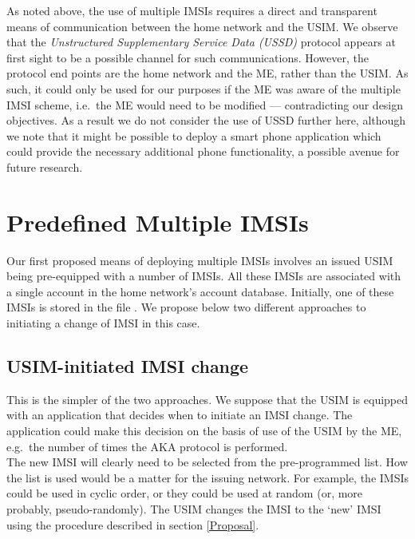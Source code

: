 \documentclass{acm_proc_article-sp}
\begin{document}
\begin{itemize}
\begin{enumerate}
\end{enumerate}

\end{itemize}

As noted above, the use of multiple IMSIs requires a direct and transparent means of communication between the home network and the USIM. We observe that the \emph{Unstructured Supplementary Service Data (USSD)} protocol appears at first sight to be a possible channel for such communications. However, the protocol end points are the home network and the ME, rather than the USIM. As such, it could only be used for our purposes if the ME was aware of the multiple IMSI scheme, i.e.\ the ME would need to be modified --- contradicting our design objectives. As a result we do not consider the use of USSD further here, although we note that it might be possible to deploy a smart phone application which could provide the necessary additional phone functionality, a possible avenue for future research.


\section{Predefined Multiple IMSIs} \label{Proposal-PM-IMSI}

Our first proposed means of deploying multiple IMSIs involves an issued USIM being pre-equipped with a number of IMSIs. All these IMSIs are associated with a single account in the home network's account database.  Initially, one of these IMSIs is stored in the file \emph{}\@. We propose below two different approaches to initiating a change of IMSI in this case.

\subsection{USIM-initiated IMSI change}  \label{USIM_Init}

This is the simpler of the two approaches. We suppose that the USIM is equipped with an application that decides when to initiate an IMSI change. The application could make this decision on the basis of use of the USIM by the ME, e.g.\ the number of times the AKA protocol is performed. \\

The new IMSI will clearly need to be selected from the pre-programmed list. How the list is used would be a matter for the issuing network. For example, the IMSIs could be used in cyclic order, or they could be used at random (or, more probably, pseudo-randomly). The USIM changes the IMSI to the `new' IMSI using the procedure described in section \ref{Proposal}.
\end{document}
